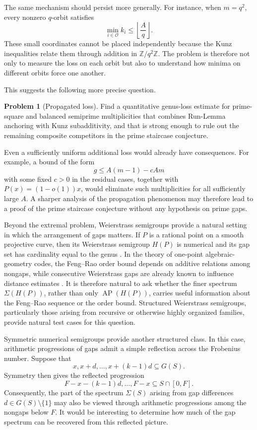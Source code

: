 \documentclass[11pt]{article}
\theoremstyle{plain}
\theoremstyle{definition}
\newtheorem{problem}[theorem]{Problem}
\theoremstyle{remark}
\newcommand{\Z}{\mathbb Z}
\begin{document}
The same mechanism should persist more generally.  For instance, when
\(m=q^2\), every nonzero \(q\)-orbit satisfies
\[
    \min_{i\in\mathcal O} k_i\leq
    \left\lfloor\frac{A}{q}\right\rfloor .
\]
These small coordinates cannot be placed independently because the Kunz
inequalities relate them through addition in \(\Z/q^2\Z\).
The problem is therefore not only to measure the loss on each orbit but also to
understand how minima on different orbits force one another.

This suggests the following more precise question.

\begin{problem}[Propagated loss]\label{prob:propagated-loss}
Find a quantitative genus-loss estimate for prime-square and balanced
semiprime multiplicities that combines Run-Lemma anchoring with Kunz
subadditivity, and that is strong enough to rule out the remaining composite
competitors in the prime staircase conjecture.
\end{problem}

Even a sufficiently uniform additional loss would already have consequences.
For example, a bound of the form
\[
    g\leq A(m-1)-cAm
\]
with some fixed \(c>0\) in the residual cases, together with
\(P(x)=(1-o(1))x\), would eliminate such multiplicities for all sufficiently
large \(A\).  A sharper analysis of the propagation phenomenon may therefore
lead to a proof of the prime staircase conjecture without any hypothesis on
prime gaps.

Beyond the extremal problem, Weierstrass semigroups provide a natural setting
in which the arrangement of gaps matters.  If \(P\) is a rational point on a
smooth projective curve, then its Weierstrass semigroup \(H(P)\) is numerical
and its gap set has cardinality equal to the genus
\cite{stichtenoth-function-fields}.  In the theory of one-point
algebraic-geometry codes, the Feng--Rao order bound depends on additive
relations among nongaps, while consecutive Weierstrass gaps are already known
to influence distance estimates
\cite{stichtenoth-function-fields,garcia-kim-lax}.  It is therefore natural to
ask whether the finer spectrum \(\Sigma(H(P))\), rather than only
\(\operatorname{AP}(H(P))\), carries useful information about the Feng--Rao
sequence or the order bound.  Structured Weierstrass semigroups, particularly
those arising from recursive or otherwise highly organized families, provide
natural test cases for this question.

Symmetric numerical semigroups provide another structured class.  In this
case, arithmetic progressions of gaps admit a simple reflection across the
Frobenius number.  Suppose that
\[
x,x+d,\ldots,x+(k-1)d\subseteq G(S).
\]
Symmetry then gives the reflected progression
\[
F-x-(k-1)d,\ldots,F-x\subseteq S\cap[0,F].
\]
Consequently, the part of the spectrum \(\Sigma(S)\) arising from gap
differences \(d\in G(S)\setminus\{1\}\) may also be viewed through arithmetic
progressions among the nongaps below \(F\).  It would be interesting to
determine how much of the gap spectrum can be recovered from this reflected
picture.
\end{document}
